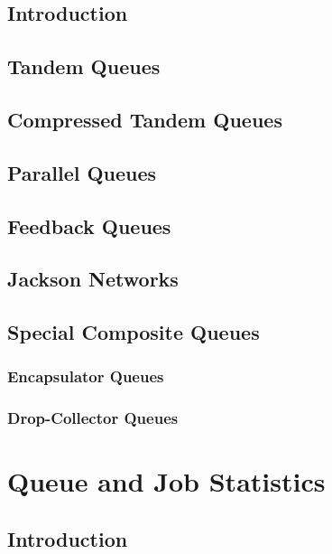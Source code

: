 \documentclass[12pt]{book}
\begin{document}
\section{Introduction}

\section{Tandem Queues}

\section{Compressed Tandem Queues}

\section{Parallel Queues}

\section{Feedback Queues}

\section{Jackson Networks}

\section{Special Composite Queues}

\subsection{Encapsulator Queues}

\subsection{Drop-Collector Queues}

\chapter{Queue and Job Statistics}

\section{Introduction}
\end{document}
